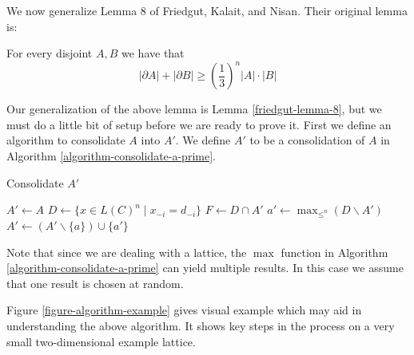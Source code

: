 	We now generalize Lemma 8 of Friedgut, Kalait, and Nisan. Their original lemma is:

	\begin{lemma}
		For every disjoint $A, B$ we have that
		\[
			|\partial A| + |\partial B| \ge \left( \frac{1}{3} \right)^n |A| \cdot |B|
		\]
	\end{lemma}

	Our generalization of the above lemma is Lemma \ref{friedgut-lemma-8}, but we must do a little bit of setup before we are ready to prove it. First we define an algorithm to consolidate $A$ into $A'$. We define $A'$ to be a consolidation of $A$ in Algorithm \ref{algorithm-consolidate-a-prime}.

	\begin{algorithm}
		\caption{Consolidate $A'$}
		\label{algorithm-consolidate-a-prime}
		\begin{algorithmic}
			\State $A' \gets A$
					\State $D \gets \{x \in L(C)^n \mid x_{-i} = d_{-i}\}$
					\State $F \gets D \cap A'$
						\State $a' \gets \max_{\le^n}(D \backslash A')$
						\State $A' \gets (A' \backslash \{a\}) \cup \{a'\}$ 
					\EndFor
				\EndFor
			\EndFor
		\end{algorithmic}
	\end{algorithm}

	Note that since we are dealing with a lattice, the $\max$ function in Algorithm \ref{algorithm-consolidate-a-prime} can yield multiple results. In this case we assume that one result is chosen at random.

	Figure \ref{figure-algorithm-example} gives visual example which may aid in understanding the above algorithm. It shows key steps in the process on a very small two-dimensional example lattice.

